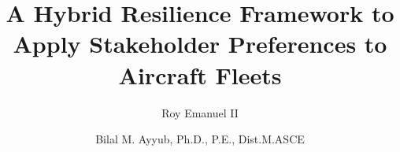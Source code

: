 \documentclass[preprint,12pt]{elsarticle}
\begin{document}
\begin{frontmatter}


\title{A Hybrid Resilience Framework to Apply Stakeholder Preferences to Aircraft Fleets}
% 
% 




\author{Roy Emanuel II}

\address{Center for Technology and Systems Management\\
Department of Civil and Environmental Engineering\\
University of Maryland, College Park\\
Maryland, United States}

\author{Bilal M. Ayyub, Ph.D., P.E., Dist.M.ASCE}

\address{Center for Technology and Systems Management\\
Department of Civil and Environmental Engineering\\
University of Maryland, College Park\\
Maryland, United States}
\begin{abstract}


\end{abstract}
\end{frontmatter}
\end{document}
